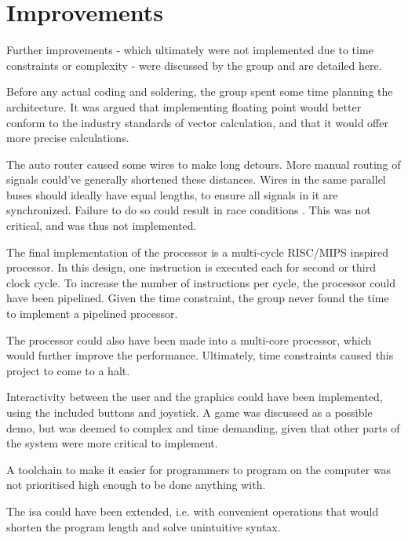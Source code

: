 \section{Improvements}
Further improvements - which ultimately were not implemented due to time constraints or complexity - were discussed by the group and are detailed here.

Before any actual coding and soldering, the group spent some time planning the architecture. It was argued that implementing floating point would better conform to the industry standards of vector calculation, and that it would offer more precise calculations.

The auto router caused some wires to make long detours.
More manual routing of signals could've generally shortened these distances.
Wires in the same parallel buses should ideally have equal lengths, to ensure all signals in it are synchronized. 
Failure to do so could result in race conditions \cite{race-conditions}. 
This was not critical, and was thus not implemented.

The final implementation of the processor is a multi-cycle RISC/MIPS inspired processor.
In this design, one instruction is executed each for second or third clock cycle.
To increase the number of instructions per cycle, the processor could have been pipelined.
Given the time constraint, the group never found the time to implement a pipelined processor.

The processor could also have been made into a multi-core processor, which would further improve the performance. Ultimately, time constraints caused this project to come to a halt.

Interactivity between the user and the graphics could have been implemented, using the included buttons and joystick. A game was discussed as a possible demo, but was deemed to complex and time demanding, given that other parts of the system were more critical to implement.

A toolchain to make it easier for programmers to program on the computer was not prioritised high enough to be done anything with.

The \gls{isa} could have been extended, i.e. with convenient operations that would shorten the program length and solve unintuitive syntax.
